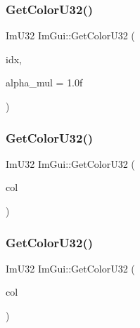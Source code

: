 \mbox{\label{namespaceImGui_a0de2d9bd347d9866511eb8d014e62556}} 
\subsubsection{\texorpdfstring{Get\+Color\+U32()}{GetColorU32()}\hspace{0.1cm}{\footnotesize\ttfamily [1/3]}}
{\footnotesize\ttfamily Im\+U32 Im\+Gui\+::\+Get\+Color\+U32 (\begin{DoxyParamCaption}\item[{Im\+Gui\+Col}]{idx,  }\item[{float}]{alpha\+\_\+mul = {\ttfamily 1.0f} }\end{DoxyParamCaption})}

\mbox{\label{namespaceImGui_ac701752365ddd58cecc1956fc62921a8}} 
\subsubsection{\texorpdfstring{Get\+Color\+U32()}{GetColorU32()}\hspace{0.1cm}{\footnotesize\ttfamily [2/3]}}
{\footnotesize\ttfamily Im\+U32 Im\+Gui\+::\+Get\+Color\+U32 (\begin{DoxyParamCaption}\item[{const \hyperlink{structImVec4}{Im\+Vec4} \&}]{col }\end{DoxyParamCaption})}

\mbox{\label{namespaceImGui_a834649713437e8fdfa0e5a4fb780d35b}} 
\subsubsection{\texorpdfstring{Get\+Color\+U32()}{GetColorU32()}\hspace{0.1cm}{\footnotesize\ttfamily [3/3]}}
{\footnotesize\ttfamily Im\+U32 Im\+Gui\+::\+Get\+Color\+U32 (\begin{DoxyParamCaption}\item[{Im\+U32}]{col }\end{DoxyParamCaption})}

